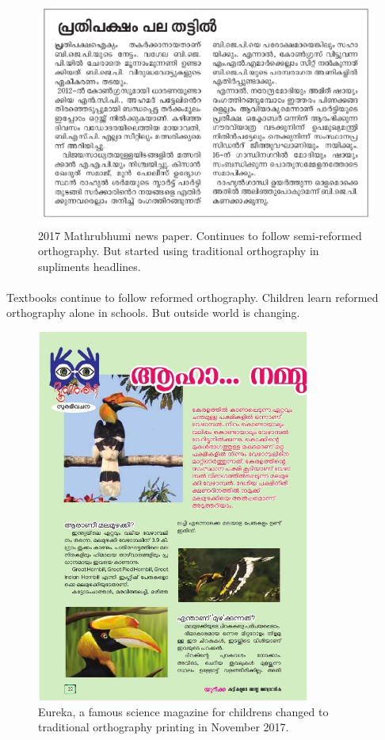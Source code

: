 \documentclass[10pt]{article}
\begin{document}
\begin{figure}[H]
	\centering
	\includegraphics[width=1.0\textwidth]{images/2017-Mathrubhumi-newspaper.png}
	\caption{2017 Mathrubhumi news paper. Continues to follow semi-reformed orthography. But started using traditional orthography in supliments headlines.}
\end{figure}

\paragraph{}
Textbooks continue to follow reformed orthography. Children learn reformed orthography alone in schools. But outside world is changing. 

\begin{figure}[H]
	\centering
	\includegraphics[width=0.8\textwidth]{images/2017-Eureka.jpg}
	\caption{Eureka, a famous science magazine for childrens changed to traditional orthography printing in November 2017.}
\end{figure}
\end{document}
